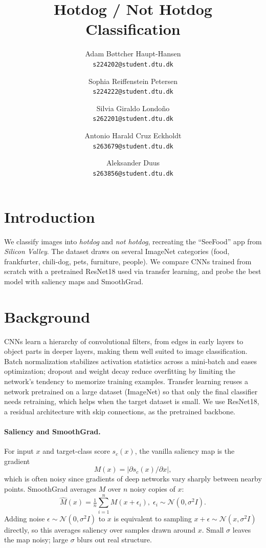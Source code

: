 \documentclass[10pt,twocolumn,letterpaper]{article}
\title{Hotdog / Not Hotdog Classification}
\author{
Adam B{\o}ttcher Haupt-Hansen\\
{\tt\small s224202@student.dtu.dk}
\and
Sophia Reiffenstein Petersen\\
{\tt\small s224222@student.dtu.dk}
\and
Silvia Giraldo Londo{\~n}o\\
{\tt\small s262201@student.dtu.dk}
\and
Antonio Harald Cruz Eckholdt\\
{\tt\small s263679@student.dtu.dk}
\and
Aleksander Duus\\
{\tt\small s263856@student.dtu.dk}
}
\begin{document}
\maketitle

\section{Introduction}
\label{sec:intro}

We classify images into \emph{hotdog} and \emph{not hotdog}, recreating the ``SeeFood'' app from \emph{Silicon Valley}. The dataset draws on several ImageNet categories (food, frankfurter, chili-dog, pets, furniture, people). We compare CNNs trained from scratch with a pretrained ResNet18 used via transfer learning, and probe the best model with saliency maps and SmoothGrad.

\section{Background}
\label{sec:background}

CNNs learn a hierarchy of convolutional filters, from edges in early layers to object parts in deeper layers, making them well suited to image classification. Batch normalization stabilizes activation statistics across a mini-batch and eases optimization; dropout and weight decay reduce overfitting by limiting the network's tendency to memorize training examples. Transfer learning reuses a network pretrained on a large dataset (ImageNet) so that only the final classifier needs retraining, which helps when the target dataset is small. We use ResNet18, a residual architecture with skip connections, as the pretrained backbone.

\paragraph{Saliency and SmoothGrad.} For input $x$ and target-class score $s_c(x)$, the vanilla saliency map is the gradient
\begin{equation}
M(x) = \left| \partial s_c(x) / \partial x \right|,
\label{eq:saliency}
\end{equation}
which is often noisy since gradients of deep networks vary sharply between nearby points. SmoothGrad averages $M$ over $n$ noisy copies of $x$:
\begin{equation}
\hat{M}(x) = \tfrac{1}{n}\textstyle\sum_{i=1}^{n} M(x + \epsilon_i), \; \epsilon_i \sim \mathcal{N}(0, \sigma^2 I).
\label{eq:smoothgrad}
\end{equation}
Adding noise $\epsilon\sim\mathcal{N}(0,\sigma^2I)$ to $x$ is equivalent to sampling $x+\epsilon \sim \mathcal{N}(x,\sigma^2I)$ directly, so this averages saliency over samples drawn around $x$. Small $\sigma$ leaves the map noisy; large $\sigma$ blurs out real structure.
\end{document}
